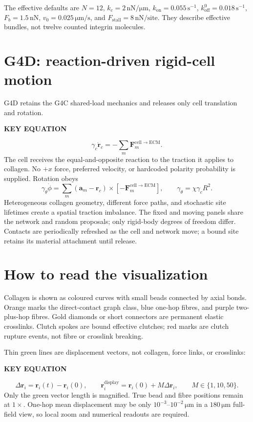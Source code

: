 \documentclass[10.5pt]{article}
\newcommand{\rv}{\mathbf r}
\newcommand{\Fv}{\mathbf F}
\newcommand{\keylabel}{\par\smallskip\noindent\textcolor{g4}{\textbf{KEY EQUATION}}\par\vspace{-5pt}}
\newcommand{\unit}[1]{\,\mathrm{#1}}
\begin{document}
The effective defaults are $N=12$, $k_c=2\unit{nN/\mu m}$,
$k_{\mathrm{on}}=0.055\unit{s^{-1}}$, $k_{\mathrm{off}}^0=0.018\unit{s^{-1}}$,
$F_b=1.5\unit{nN}$, $v_0=0.025\unit{\mu m/s}$, and
$F_{\mathrm{stall}}=8\unit{nN/site}$. They describe effective bundles, not twelve counted
integrin molecules.

\section{G4D: reaction-driven rigid-cell motion}

G4D retains the G4C shared-load mechanics and releases only cell translation and rotation.
\keylabel
\begin{equation}
 \gamma_c\dot{\rv}_c=-\sum_m\Fv_m^{\mathrm{cell\to ECM}}.
 \label{eq:translation}
\end{equation}
The cell receives the equal-and-opposite reaction to the traction it applies to collagen. No
$+x$ force, preferred velocity, or hardcoded polarity probability is supplied. Rotation obeys
\begin{equation}
 \gamma_\theta\dot\phi=
 \sum_m(\mathbf a_m-\rv_c)\times[-\Fv_m^{\mathrm{cell\to ECM}}],
 \qquad
 \gamma_\theta=\chi\gamma_cR^2.
 \label{eq:rotation}
\end{equation}
Heterogeneous collagen geometry, different force paths, and stochastic site lifetimes create a
spatial traction imbalance. The fixed and moving panels share the network and random proposals;
only rigid-body degrees of freedom differ. Contacts are periodically refreshed as the cell and
network move; a bound site retains its material attachment until release.

\section{How to read the visualization}

Collagen is shown as coloured curves with small beads connected by axial bonds. Orange marks the
direct-contact graph class, blue one-hop fibres, and purple two-plus-hop fibres. Gold diamonds or
short connectors are permanent elastic crosslinks. Clutch spokes are bound effective clutches;
red marks are clutch rupture events, not fibre or crosslink breaking.

Thin green lines are displacement vectors, not collagen, force links, or crosslinks:
\keylabel
\begin{equation}
 \Delta\rv_i=\rv_i(t)-\rv_i(0),\qquad
 \rv_i^{\mathrm{display}}=\rv_i(0)+M\Delta\rv_i,
 \qquad M\in\{1,10,50\}.
 \label{eq:display}
\end{equation}
Only the green vector length is magnified. True bead and fibre positions remain at $1\times$.
One-hop mean displacement may be only $10^{-3}$--$10^{-2}\unit{\mu m}$ in a
$180\unit{\mu m}$ full-field view, so local zoom and numerical readouts are required.
\end{document}
